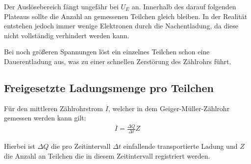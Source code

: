 Der Auslösebereich fängt ungefähr bei $U_E$ an. Innerhalb des darauf folgenden Plateaus sollte die
Anzahl an gemessenen Teilchen gleich bleiben. In der Realität entstehen jedoch immer wenige Elektronen durch die Nachentladung,
da diese nicht vollständig verhindert werden kann.

Bei noch größeren Spannungen löst ein einzelnes Teilchen schon eine Dauerentladung aus, was zu einer schnellen Zerstörung
des Zählrohrs führt.


\subsection{Freigesetzte Ladungsmenge pro Teilchen}

Für den mittleren Zählrohrstrom $\overline{I}$, welcher in dem Geiger-Müller-Zählrohr gemessen werden kann gilt:
\begin{align}
  \overline{I} = \frac{\Delta Q}{\Delta t} Z
\end{align}

Hierbei ist $\Delta Q$ die pro Zeitintervall $\Delta t$ einfallende transportierte Ladung und $Z$ die Anzahl an Teilchen die in diesem
Zeitintervall registriert werden.
